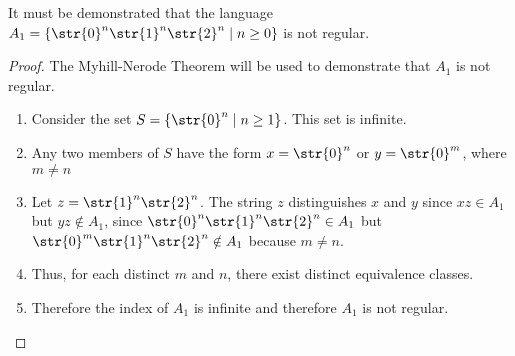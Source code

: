 It must be demonstrated that the language $A_1 = \{ \str{0}^n\str{1}^n\str{2}^n \mid n \geq 0 \}$ is not regular.

\begin{proof}
The Myhill-Nerode Theorem will be used to demonstrate that $A_1$ is not regular.
	\begin{enumerate}[label=\Roman*.]
		\item Consider the set $S = \{\str{0}^n \mid n \geq 1\}$. This set is infinite.
		\item Any two members of $S$ have the form $x = \str{0}^n$ or $y = \str{0}^m$, where $m \neq n$
		\item Let $z = \str{1}^n\str{2}^n$. The string $z$ distinguishes $x$ and $y$ since $xz \in A_1$ but $yz \notin A_1$, since $\str{0}^n\str{1}^n\str{2}^n \in A_1$ but $\str{0}^m\str{1}^n\str{2}^n \notin A_1$ because $m \neq n$.
		\item Thus, for each distinct $m$ and $n$, there exist distinct equivalence classes.
		\item Therefore the index of $A_1$ is infinite and therefore $A_1$ is not regular.
	\end{enumerate}
\end{proof}